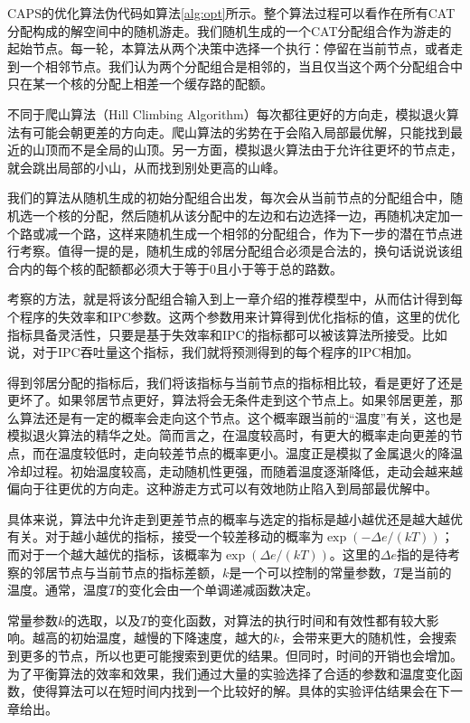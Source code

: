 CAPS的优化算法伪代码如算法\ref{alg:opt}所示。整个算法过程可以看作在所有CAT分配构成的解空间中的随机游走。我们随机生成的一个CAT分配组合作为游走的起始节点。每一轮，本算法从两个决策中选择一个执行：停留在当前节点，或者走到一个相邻节点。我们认为两个分配组合是相邻的，当且仅当这个两个分配组合中只在某一个核的分配上相差一个缓存路的配额。

不同于爬山算法（Hill Climbing Algorithm）每次都往更好的方向走，模拟退火算法有可能会朝更差的方向走。爬山算法的劣势在于会陷入局部最优解，只能找到最近的山顶而不是全局的山顶。另一方面，模拟退火算法由于允许往更坏的节点走，就会跳出局部的小山，从而找到别处更高的山峰。

我们的算法从随机生成的初始分配组合出发，每次会从当前节点的分配组合中，随机选一个核的分配，然后随机从该分配中的左边和右边选择一边，再随机决定加一个路或减一个路，这样来随机生成一个相邻的分配组合，作为下一步的潜在节点进行考察。值得一提的是，随机生成的邻居分配组合必须是合法的，换句话说说该组合内的每个核的配额都必须大于等于0且小于等于总的路数。

考察的方法，就是将该分配组合输入到上一章介绍的推荐模型中，从而估计得到每个程序的失效率和IPC参数。这两个参数用来计算得到优化指标的值，这里的优化指标具备灵活性，只要是基于失效率和IPC的指标都可以被该算法所接受。比如说，对于IPC吞吐量这个指标，我们就将预测得到的每个程序的IPC相加。

得到邻居分配的指标后，我们将该指标与当前节点的指标相比较，看是更好了还是更坏了。如果邻居节点更好，算法将会无条件走到这个节点上。如果邻居更差，那么算法还是有一定的概率会走向这个节点。这个概率跟当前的“温度”有关，这也是模拟退火算法的精华之处。简而言之，在温度较高时，有更大的概率走向更差的节点，而在温度较低时，走向较差节点的概率更小。温度正是模拟了金属退火的降温冷却过程。初始温度较高，走动随机性更强，而随着温度逐渐降低，走动会越来越偏向于往更优的方向走。这种游走方式可以有效地防止陷入到局部最优解中。

具体来说，算法中允许走到更差节点的概率与选定的指标是越小越优还是越大越优有关。对于越小越优的指标，接受一个较差移动的概率为$\exp(-\Delta e / (kT))$；而对于一个越大越优的指标，该概率为$\exp(\Delta e / (kT))$。这里的$\Delta e$指的是待考察的邻居节点与当前节点的指标差额，$k$是一个可以控制的常量参数，$T$是当前的温度。通常，温度$T$的变化会由一个单调递减函数决定。

常量参数$k$的选取，以及$T$的变化函数，对算法的执行时间和有效性都有较大影响。越高的初始温度，越慢的下降速度，越大的$k$，会带来更大的随机性，会搜索到更多的节点，所以也更可能搜索到更优的结果。但同时，时间的开销也会增加。为了平衡算法的效率和效果，我们通过大量的实验选择了合适的参数和温度变化函数，使得算法可以在短时间内找到一个比较好的解。具体的实验评估结果会在下一章给出。